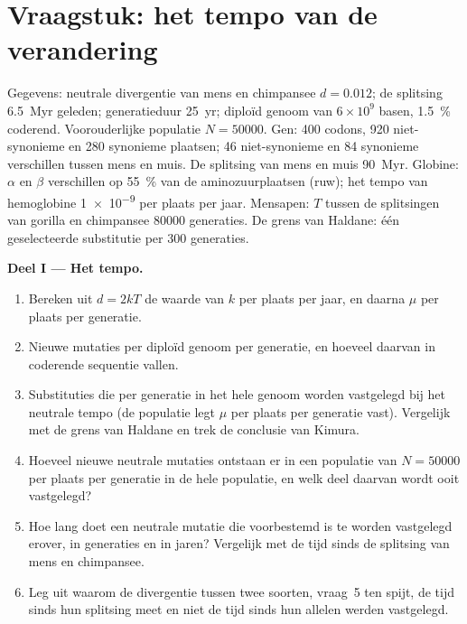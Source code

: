 \section{Vraagstuk: het tempo van de verandering}

\begin{problem}
\label{pb:b3:molecular-evolution:1}
Gegevens: neutrale divergentie van mens en chimpansee $d = 0.012$; de
splitsing \qty{6.5}{Myr} geleden; generatieduur \qty{25}{yr}; diploïd
genoom van $6\times
10^{9}$ basen, \qty{1.5}{\%} coderend. Voorouderlijke populatie $N =
\num{50000}$. Gen: 400 codons, 920 niet-synonieme en 280 synonieme
plaatsen; 46 niet-synonieme en 84 synonieme verschillen tussen mens en
muis. De splitsing van mens en muis \qty{90}{Myr}. Globine: $\alpha$ en
$\beta$ verschillen op \qty{55}{\%} van de aminozuurplaatsen (ruw); het
tempo van hemoglobine \num{1e-9} per plaats per jaar. Mensapen: $T$
tussen de splitsingen van gorilla en chimpansee \num{80000} generaties.
De grens van Haldane: één geselecteerde substitutie per 300 generaties.

\medskip
\noindent\textbf{Deel I --- Het tempo.}
\begin{enumerate}
  \item Bereken uit $d = 2kT$ de waarde van $k$ per plaats per jaar, en
        daarna $\mu$ per plaats per generatie.
  \item Nieuwe mutaties per diploïd genoom per generatie, en hoeveel
        daarvan in coderende sequentie vallen.
  \item Substituties die per generatie in het hele genoom worden
        vastgelegd bij het neutrale tempo (de populatie legt $\mu$ per
        plaats per generatie vast). Vergelijk met de grens van Haldane
        en trek de conclusie van Kimura.
  \item Hoeveel nieuwe neutrale mutaties ontstaan er in een populatie
        van $N = \num{50000}$ per plaats per generatie in de hele
        populatie, en welk deel daarvan wordt ooit vastgelegd?
  \item Hoe lang doet een neutrale mutatie die voorbestemd is te worden
        vastgelegd erover, in generaties en in jaren? Vergelijk met de
        tijd sinds de splitsing van mens en chimpansee.
  \item Leg uit waarom de divergentie tussen twee soorten, vraag~5 ten
        spijt, de tijd sinds hun splitsing meet en niet de tijd sinds
        hun allelen werden vastgelegd.
\end{enumerate}


\end{problem}
